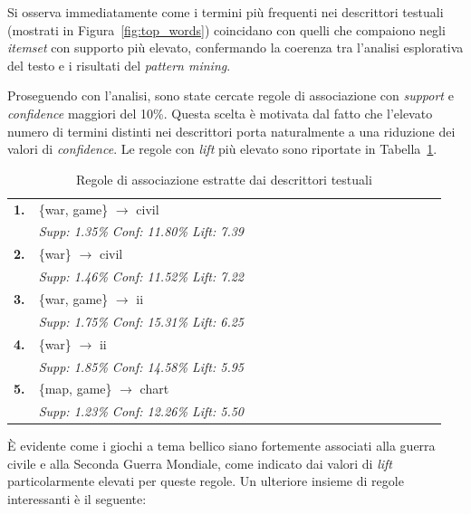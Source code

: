 \documentclass[10pt,twocolumn]{article}
\begin{document}
Si osserva immediatamente come i termini più frequenti nei descrittori testuali (mostrati in Figura~\ref{fig:top_words}) coincidano con quelli che compaiono negli \textit{itemset} con supporto più elevato, confermando la coerenza tra l’analisi esplorativa del testo e i risultati del \textit{pattern mining}.

Proseguendo con l’analisi, sono state cercate regole di associazione con \textit{support} e \textit{confidence} maggiori del 10\%. Questa scelta è motivata dal fatto che l’elevato numero di termini distinti nei descrittori porta naturalmente a una riduzione dei valori di \textit{confidence}. Le regole con \textit{lift} più elevato sono riportate in Tabella~\ref{tab:rules_descriptors}.

\begin{table}[ht!]
    \centering
    \footnotesize
    \renewcommand{\arraystretch}{1.2}
    \caption{Regole di associazione estratte dai descrittori testuali}
    \label{tab:rules_descriptors}
    \begin{tabular}{@{} p{0.05\linewidth} p{0.9\linewidth} @{}} 
        \hline
        \textbf{1.} & \{war, game\} $\to$ civil \\
         & \textit{Supp: 1.35\% \quad Conf: 11.80\% \quad Lift: 7.39} \\ 
        \hline
        \textbf{2.} & \{war\} $\to$ civil \\
         & \textit{Supp: 1.46\% \quad Conf: 11.52\% \quad Lift: 7.22} \\ 
        \hline
        \textbf{3.} & \{war, game\} $\to$ ii \\
         & \textit{Supp: 1.75\% \quad Conf: 15.31\% \quad Lift: 6.25} \\ 
        \hline
        \textbf{4.} & \{war\} $\to$ ii \\
         & \textit{Supp: 1.85\% \quad Conf: 14.58\% \quad Lift: 5.95} \\ 
        \hline
        \textbf{5.} & \{map, game\} $\to$ chart \\
         & \textit{Supp: 1.23\% \quad Conf: 12.26\% \quad Lift: 5.50} \\ 
        \hline
    \end{tabular}
\end{table}

È evidente come i giochi a tema bellico siano fortemente associati alla guerra civile e alla Seconda Guerra Mondiale, come indicato dai valori di \textit{lift} particolarmente elevati per queste regole. Un ulteriore insieme di regole interessanti è il seguente:
\end{document}
